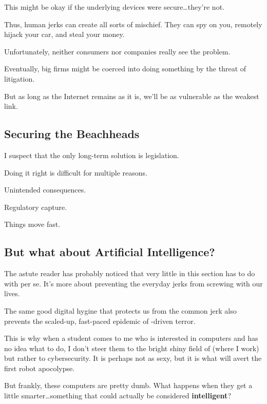 This might be okay if the underlying devices were secure\dots they're
not.  

Thus, human jerks can create all sorts of mischief.  They can spy on
you, remotely hijack your car, and steal your money.  

Unfortunately, neither consumers nor companies really see the problem.

Eventually, big firms might be coerced into doing something by the threat of litigation.

But as long as the Internet remains as it is, we'll be as vulnerable as the weakest link.

\subsection{Securing the Beachheads}

I suspect that the only long-term solution is legislation.

Doing it right is difficult for multiple reasons.

Unintended consequences.

Regulatory capture.

Things move fast.

\subsection{But what about Artificial Intelligence?}

The astute reader has probably noticed that very little in this
section has to do with  per se.  It's more about preventing
the everyday jerks from screwing with our lives.

The same good digital hygine that protects us from the common jerk
also prevents the scaled-up, fast-paced epidemic of -driven terror.  

This is why when a student comes to me who is interested in computers
and has no idea what to do, I don't steer them to the bright shiny
field of  (where I work) but rather to cybersecurity.  It is
perhaps not as sexy, but it is what will avert the first robot apocolypse.

But frankly, these computers are pretty dumb.  What happens when they
get a little smarter\dots something that could actually be considered
{\bf intelligent}?
